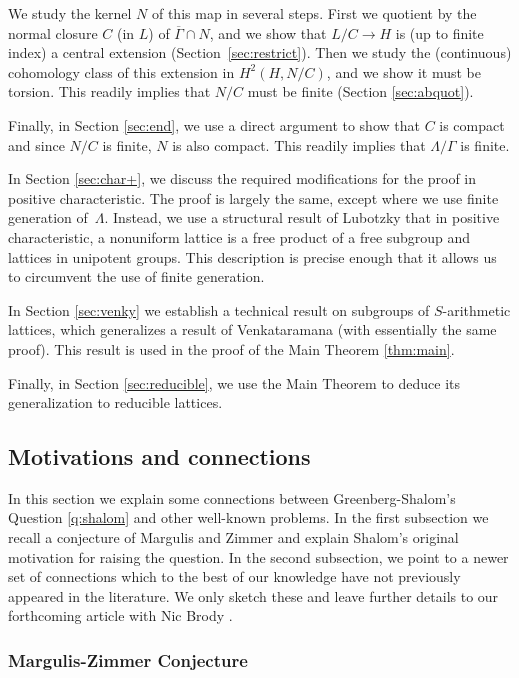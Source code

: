 We study the kernel $N$ of this map in several steps. First we quotient by the normal closure $C$ (in $L$) of $\overline{\Gamma}\cap N$, and we show that $L/C\to H$ is (up to finite index) a central extension (Section~\ref{sec:restrict}). Then we study the (continuous) cohomology class of this extension in $H^2(H,N/C)$, and we show it must be torsion. This readily implies that $N/C$ must be finite (Section \ref{sec:abquot}).

Finally, in Section \ref{sec:end}, we use a direct argument to show that $C$ is compact and since $N/C$ is finite, $N$ is also compact. This readily implies that $\Lambda/\Gamma$ is finite.

In Section \ref{sec:char+}, we discuss the required modifications for the proof in positive characteristic. The proof is largely the same, except where we use finite generation of~$\Lambda$. \hbox{Instead}, we use a structural result of Lubotzky that in positive characteristic, a nonuniform lattice is a free product of a free subgroup and lattices in unipotent groups. This description is precise enough that it allows us to circumvent the use of finite generation.

In Section \ref{sec:venky} we establish a technical result on subgroups of $S$-arithmetic lattices, which generalizes a result of Venkataramana (with essentially the same proof). This result is used in the proof of the Main Theorem \ref{thm:main}.

Finally, in Section \ref{sec:reducible}, we use the Main Theorem to deduce its generalization to reducible lattices.

\subsection{Motivations and connections}
\label{sec:connect}

In this section we explain some connections between Greenberg-Shalom's Question \ref{q:shalom} and other well-known problems. In the first subsection we recall a conjecture of Margulis and Zimmer and explain Shalom's original motivation for raising the question. In the second subsection, we point to a newer set of connections which to the best of our knowledge have not previously appeared in the literature. We only sketch these and leave further details to our forthcoming article with Nic Brody \cite{BFMVL}.

\subsubsection{Margulis-Zimmer Conjecture}
\label{subsec:mz}

